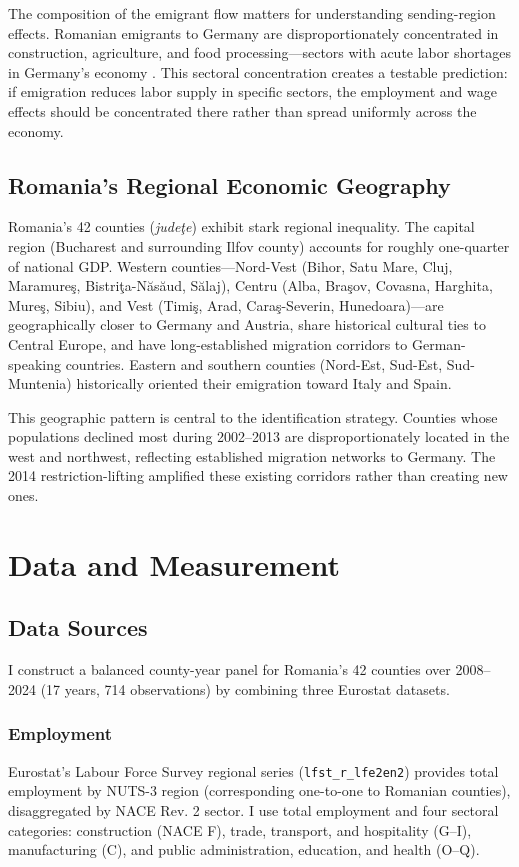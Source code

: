 \documentclass[12pt]{article}
\begin{document}
The composition of the emigrant flow matters for understanding sending-region effects. Romanian emigrants to Germany are disproportionately concentrated in construction, agriculture, and food processing---sectors with acute labor shortages in Germany's economy \citep{kahanec2013labor}. This sectoral concentration creates a testable prediction: if emigration reduces labor supply in specific sectors, the employment and wage effects should be concentrated there rather than spread uniformly across the economy.

\subsection{Romania's Regional Economic Geography}

Romania's 42 counties (\textit{jude\c{t}e}) exhibit stark regional inequality. The capital region (Bucharest and surrounding Ilfov county) accounts for roughly one-quarter of national GDP. Western counties---Nord-Vest (Bihor, Satu Mare, Cluj, Maramure\c{s}, Bistri\c{t}a-N\u{a}s\u{a}ud, S\u{a}laj), Centru (Alba, Bra\c{s}ov, Covasna, Harghita, Mure\c{s}, Sibiu), and Vest (Timi\c{s}, Arad, Cara\c{s}-Severin, Hunedoara)---are geographically closer to Germany and Austria, share historical cultural ties to Central Europe, and have long-established migration corridors to German-speaking countries. Eastern and southern counties (Nord-Est, Sud-Est, Sud-Muntenia) historically oriented their emigration toward Italy and Spain.

This geographic pattern is central to the identification strategy. Counties whose populations declined most during 2002--2013 are disproportionately located in the west and northwest, reflecting established migration networks to Germany. The 2014 restriction-lifting amplified these existing corridors rather than creating new ones.


\section{Data and Measurement}

\subsection{Data Sources}

I construct a balanced county-year panel for Romania's 42 counties over 2008--2024 (17 years, 714 observations) by combining three Eurostat datasets.

\subsubsection*{Employment} Eurostat's Labour Force Survey regional series (\texttt{lfst\_r\_lfe2en2}) provides total employment by NUTS-3 region (corresponding one-to-one to Romanian counties), disaggregated by NACE Rev. 2 sector. I use total employment and four sectoral categories: construction (NACE F), trade, transport, and hospitality (G--I), manufacturing (C), and public administration, education, and health (O--Q).
\end{document}
